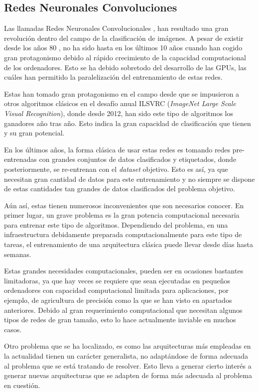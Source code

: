 \subsection{Redes Neuronales Convoluciones}

Las llamadas Redes Neuronales Convolucionales \cite{Alzubaidi2021}, han resultado una gran revolución dentro del campo de la clasificación de imágenes. A pesar de existir desde los años 80 \cite{Fukushima1980}, no ha sido hasta en los últimos 10 años cuando han cogido gran protagonismo debido al rápido crecimiento de la capacidad computacional de los ordenadores. Esto se ha debido sobretodo del desarrollo de las GPUs, las cuáles han permitido la paralelización del entrenamiento de estas redes.

Estas han tomado gran protagonismo en el campo desde que se impusieron a otros algoritmos clásicos en el desafío anual ILSVRC (\textit{ImageNet Large Scale Visual Recognition}), donde desde 2012, han sido este tipo de algoritmos los ganadores año tras año. Esto indica la gran capacidad de clasificación que tienen y su gran potencial.

En los últimos años, la forma clásica de usar estas redes es tomando redes pre-entrenadas con grandes conjuntos de datos clasificados y etiquetados, donde posteriormente, se re-entrenan con el \textit{dataset} objetivo. Esto es así, ya que necesitan gran cantidad de datos para este entrenamiento y no siempre se dispone de estas cantidades tan grandes de datos clasificados del problema objetivo.

Aún así, estas tienen numerosos inconvenientes que son necesarios conocer. En primer lugar, un grave problema es la gran potencia computacional necesaria para entrenar este tipo de algoritmos. Dependiendo del problema, en una infraestructura debidamente preparada computacionalmente para este tipo de tareas, el entrenamiento de una arquitectura clásica puede llevar desde días hasta semanas.

Estas grandes necesidades computacionales, pueden ser en ocasiones bastantes limitadoras, ya que hay veces se requiere que sean ejecutadas en pequeños ordenadores con capacidad computacional limitada para aplicaciones, por ejemplo, de agricultura de precisión como la que se han visto en apartados anteriores. Debido al gran requerimiento computacional que necesitan algunos tipos de redes de gran tamaño, esto lo hace actualmente inviable en muchos casos.

Otro problema que se ha localizado, es como las arquitecturas más empleadas en la actualidad tienen un carácter generalista, no adaptándose de forma adecuada al problema que se está tratando de resolver. Esto lleva a generar cierto interés a generar nuevas arquitecturas que se adapten de forma más adecuada al problema en cuestión.

